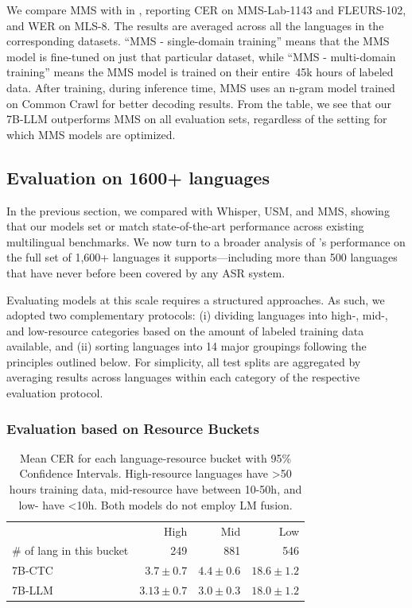 \documentclass[]{fairmeta}
\begin{document}
We compare MMS with \OmniASR in , reporting CER on MMS-Lab-1143 and FLEURS-102, and WER on MLS-8. The results are averaged across all the languages in the corresponding datasets. ``MMS - single-domain training'' means that the MMS model is fine-tuned on just that particular dataset, while ``MMS - multi-domain training'' means the MMS model is trained on their entire~45k hours of labeled data. After training, during inference time, MMS uses an n-gram model trained on Common Crawl for better decoding results.  From the table, we see that our 7B-LLM outperforms MMS on all evaluation sets, regardless of the setting for which MMS models are optimized.


\subsection{Evaluation on 1600+ languages}
\label{sec:eval_1600}

In the previous section, we compared \OmniASR with Whisper, USM, and MMS, showing that our models set or match state-of-the-art performance across existing multilingual benchmarks. We now turn to a broader analysis of \OmniASR’s performance on the full set of 1,600+ languages it supports—including more than 500 languages that have never before been covered by any ASR system.

Evaluating models at this scale requires a structured approaches. As such, we adopted two complementary protocols: (i) dividing languages into high-, mid-, and low-resource categories based on the amount of labeled training data available, and (ii) sorting languages into 14 major groupings following the principles outlined below. For simplicity, all test splits are aggregated by averaging results across languages within each category of the respective evaluation protocol.

\subsubsection{Evaluation based on Resource Buckets}

\begin{table}[htbp]
  \centering
  \begin{tabular}{lrrr}
    \toprule
     &  High  &  Mid  &  Low  \\
    \# of lang in this bucket   &  249 & 881  & 546  \\
    \midrule
    7B-CTC & $3.7\pm 0.7$ & $4.4\pm 0.6$ & $18.6\pm 1.2$ \\
    7B-LLM & $3.13\pm 0.7$ & $3.0\pm 0.3$ & $18.0\pm 1.2$ \\
    \bottomrule
  \end{tabular}
  \caption{Mean CER for each language-resource bucket with 95\% Confidence Intervals. High-resource languages have >50 hours training data, mid-resource have between 10-50h, and low- have <10h. Both models do not employ LM fusion.}
  \label{tab:resource_bucket_mean_cers}
\end{table}
\end{document}

